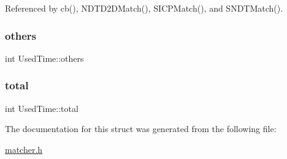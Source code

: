 Referenced by cb(), N\+D\+T\+D2\+D\+Match(), S\+I\+C\+P\+Match(), and S\+N\+D\+T\+Match().

\mbox{\label{structUsedTime_a7a75c587cf7d911a6507259c6961c2bd}} 
\subsubsection{\texorpdfstring{others}{others}}
{\footnotesize\ttfamily int Used\+Time\+::others}

\mbox{\label{structUsedTime_a8ee888b4df3b9aa70450480eae92cd82}} 
\subsubsection{\texorpdfstring{total}{total}}
{\footnotesize\ttfamily int Used\+Time\+::total}



The documentation for this struct was generated from the following file\+:\begin{DoxyCompactItemize}
\item 
\hyperlink{matcher_8h}{matcher.\+h}\end{DoxyCompactItemize}
